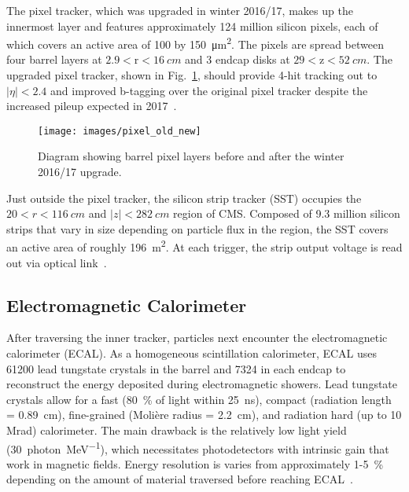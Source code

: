 \documentclass[12pt]{article}
\begin{document}
        The pixel tracker, which was upgraded in winter 2016/17, makes up the innermost layer and features approximately \num{124} million silicon pixels, each of which covers an active area of \num{100} by \SI{150}{\micro\meter^2}. The pixels are spread between four barrel layers at $\num{2.9}<\mathrm{r}<\SI{16}{cm}$ and 3 endcap disks at $\num{29} < \mathrm{z} < \SI{52}{cm}$. The upgraded pixel tracker, shown in Fig.~\ref{pixel_old_new}, should provide 4-hit tracking out to $\lvert\eta\rvert < \num{2.4}$ and improved b-tagging over the original pixel tracker despite the increased pileup expected in 2017~\cite{cms_pixel_upgrade}.

        \noindent \begin{figure}[htbp] \begin{center}
            \texttt{[image: images/pixel\_old\_new]}
            \caption{Diagram showing barrel pixel layers before and after the winter 2016/17 upgrade.~\cite{pixel_old_new}}
            \label{pixel_old_new}
        \end{center} \end{figure}
        
        Just outside the pixel tracker, the silicon strip tracker (SST) occupies the $\num{20} < r < \SI{116}{cm}$ and $\lvert z \rvert < \SI{282}{cm}$ region of CMS. Composed of \num{9.3} million silicon strips that vary in size  depending on particle flux in the region, the SST covers an active area of roughly \SI{196}{m^2}. At each trigger, the strip output voltage is read out via optical link~\cite{cms_pixel_upgrade}.

    \subsection{Electromagnetic Calorimeter}
        After traversing the inner tracker, particles next encounter the electromagnetic calorimeter (ECAL). As a homogeneous scintillation calorimeter, ECAL uses \num{61200} lead tungstate crystals in the barrel and \num{7324} in each endcap to reconstruct the energy deposited during electromagnetic showers. Lead tungstate crystals allow for a fast (\SI{80}{\percent} of light within \SI{25}{\nano\s}), compact (radiation length = \SI{0.89}{cm}), fine-grained (Moli\`ere radius = \SI{2.2}{cm}), and radiation hard (up to 10 Mrad) calorimeter. The main drawback is the relatively low light yield (\SI{30}{photon\per\mega\electronvolt}), which necessitates photodetectors with intrinsic gain that work in magnetic fields\cite{cms_experiment, cms_tdr}. Energy resolution is varies from approximately \num{1}-\SI{5}{\percent} depending on the amount of material traversed before reaching ECAL~\cite{ecal_performance}.
\end{document}
